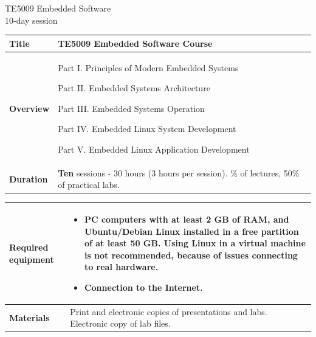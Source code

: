 \documentclass[a4paper,12pt,obeyspaces,spaces,hyphens]{article}
\begin{document}
\thispagestyle{fancy}

\setlength{\arrayrulewidth}{0.8pt}

\begin{center}
\LARGE
TE5009 Embedded Software\\
\large
10-day session
\end{center}
\vspace{1cm}

\small
{}

 {
  \begin{tabularx}{\textwidth}{|g|h|}
    {\bf Title} & TE5009 Embedded Software Course \\
    \hline

    {\bf Overview} &
    Part I.   Principles of Modern Embedded Systems \par
    Part II.  Embedded Systems Architecture \par
    Part III. Embedded Systems Operation \par
    Part IV.  Embedded Linux System Development \par
    Part V.   Embedded Linux Application Development \\
    \hline

    {\bf Duration} & {\bf Ten} sessions - 30 hours (3 hours per session).
    \% of lectures, 50\% of practical labs.  \\
    \hline
  \end{tabularx}

  \begin{tabularx}{\textwidth}{|g|h|}
    {\bf Required equipment} &
    \begin{itemize}
    \item PC computers with at least 2 GB of RAM, and Ubuntu/Debian Linux
    installed in a {\bf free partition of at least 50 GB. Using Linux
      in a virtual machine is not recommended}, because of issues
    connecting to real hardware.
    \item {\bf Connection to the Internet}.
    \end{itemize} \\
    \hline

    {\bf Materials} & Print and electronic copies of presentations and
    labs.
    \newline Electronic copy of lab files.\\
    \hline

  \end{tabularx}}
\normalsize
\end{document}

